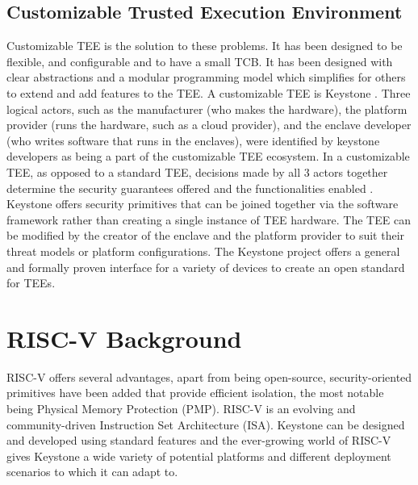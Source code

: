 \subsection{Customizable Trusted Execution Environment}
Customizable TEE is the solution to these problems. It has been designed to be flexible, and configurable and to have a small TCB. It has been designed with clear abstractions and a modular programming model which simplifies for others to extend and add features to the TEE. A customizable TEE is Keystone \cite{lee2020keystone}. Three logical actors, such as the manufacturer (who makes the hardware), the platform provider (runs the hardware, such as a cloud provider), and the enclave developer (who writes software that runs in the enclaves), were identified by keystone developers as being a part of the customizable TEE ecosystem. In a customizable TEE, as opposed to a standard TEE, decisions made by all 3 actors together determine the security guarantees offered and the functionalities enabled \cite{keysyone-blog-1}. 
Keystone offers security primitives that can be joined together via the software framework rather than creating a single instance of TEE hardware. The TEE can be modified by the creator of the enclave and the platform provider to suit their threat models or platform configurations. The Keystone project offers a general and formally proven interface for a variety of devices to create an open standard for TEEs. 

\section{RISC-V Background}
RISC-V offers several advantages, apart from being open-source, security-oriented primitives have been added that provide efficient isolation, the most notable being Physical Memory Protection (PMP). RISC-V is an evolving and community-driven Instruction Set Architecture (ISA). Keystone can be designed and developed using standard features and the ever-growing world of RISC-V gives Keystone a wide variety of potential platforms and different deployment scenarios to which it can adapt to. \cite{keysyone-blog-2}

